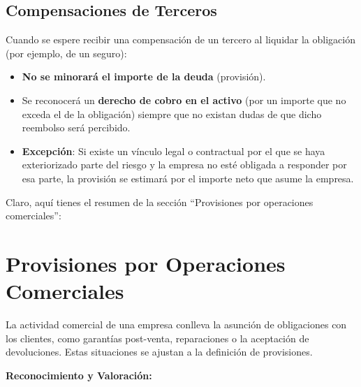 \documentclass[
  paper=a4,
  ,captions=tableheading
]{scrbook}
\providecommand{\tightlist}{%
  \setlength{\itemsep}{0pt}\setlength{\parskip}{0pt}}
\begin{document}
\hypertarget{compensaciones-de-terceros}{%
\subsection{Compensaciones de
Terceros}\label{compensaciones-de-terceros}}

Cuando se espere recibir una compensación de un tercero al liquidar la
obligación (por ejemplo, de un seguro):

\begin{itemize}
\tightlist
\item
  \textbf{No se minorará el importe de la deuda} (provisión).
\item
  Se reconocerá un \textbf{derecho de cobro en el activo} (por un
  importe que no exceda el de la obligación) siempre que no existan
  dudas de que dicho reembolso será percibido.
\item
  \textbf{Excepción}: Si existe un vínculo legal o contractual por el
  que se haya exteriorizado parte del riesgo y la empresa no esté
  obligada a responder por esa parte, la provisión se estimará por el
  importe neto que asume la empresa.
\end{itemize}

Claro, aquí tienes el resumen de la sección ``Provisiones por
operaciones comerciales'':

\hypertarget{provisiones-por-operaciones-comerciales}{%
\section{Provisiones por Operaciones
Comerciales}\label{provisiones-por-operaciones-comerciales}}

La actividad comercial de una empresa conlleva la asunción de
obligaciones con los clientes, como garantías post-venta, reparaciones o
la aceptación de devoluciones. Estas situaciones se ajustan a la
definición de provisiones.

\textbf{Reconocimiento y Valoración:}
\end{document}
